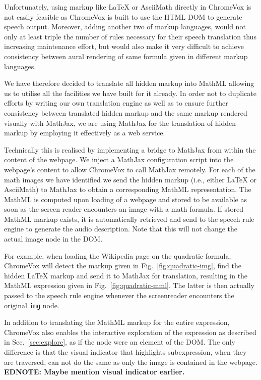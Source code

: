 \documentclass{acm_proc_article-sp}
\newcommand\ednote[1]{\typeout{There is still a note!!!}%
  {\bf EDNOTE: #1}}
\begin{document}
Unfortunately, using markup like {\LaTeX} or AsciiMath directly in ChromeVox is
not easily feasible as ChromeVox is built to use the HTML DOM to generate speech
output. Moreover, adding another two of markup languages, would not only at
least triple the number of rules necessary for their speech translation thus
increasing maintenance effort, but would also make it very difficult to achieve
consistency between aural rendering of same formula given in different markup
languages.

We have therefore decided to translate all hidden markup into MathML allowing us
to utilise all the facilities we have built for it already. In order not to
duplicate efforts by writing our own translation engine as well as to ensure
further consistency between translated hidden markup and the same markup
rendered visually with MathJax, we are using MathJax for the translation of
hidden markup by employing it effectively as a web service.

Technically this is realised by implementing a bridge to MathJax from within the
content of the webpage. We inject a MathJax configuration script into the
webpage's content to allow ChromeVox to call MathJax remotely. For each of the
math images we have identified we send the hidden markup (i.e., either {\LaTeX}
or AsciiMath) to MathJax to obtain a corresponding MathML representation. The
MathML is computed upon loading of a webpage and stored to be available as soon
as the screen reader encounters an image with a math formula. If stored MathML
markup exists, it is automatically retrieved and send to the speech rule engine
to generate the audio description. Note that this will not change the actual
image node in the DOM.

For example, when loading the Wikipedia page on the quadratic formula, ChromeVox
will detect the markup given in Fig.~\ref{fig:quadratic-img}, find the hidden
{\LaTeX} markup and send it to MathJax for translation, resulting in the MathML
expression given in Fig.~\ref{fig:quadratic-mml}. The latter is then actually
passed to the speech rule engine whenever the screenreader encounters the
original \texttt{img} node.

In addition to translating the MathML markup for the entire expression,
ChromeVox also enables the interactive exploration of the expression as
described in Sec.~\ref{sec:explore}, as if the node were an element of the
DOM. The only difference is that the visual indicator that highlights
subexpression, when they are traversed, can not do the same as only the image is
contained in the webpage.  \ednote{Maybe mention visual indicator earlier.}
\end{document}

